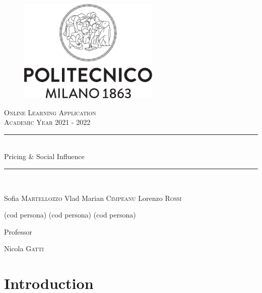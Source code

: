 \documentclass{article}
\begin{document}
\begin{titlepage}
      \centering
      \begin{figure}
            \begin{center}
                  \includegraphics[width=0.6\textwidth]{img/logo_polimi.png}
            \end{center}
      \end{figure}
      \vfill
      {\scshape\LARGE Online Learning Application\\Academic Year 2021 - 2022 \par}
      
      
      \vfill
      \newcommand{\HRule}{\rule{\linewidth}{0.3mm}}
      \centering
      \HRule \\[0.4cm]
      \huge  Pricing \& Social Influence\\%
      \HRule \\
      \vspace{1cm}
      {\Large Sofia \textsc{Martellozzo} \quad  Vlad Marian \textsc{Cimpeanu}  \quad  Lorenzo \textsc{Rossi}\par}
      {\Large(cod persona) \quad (cod persona) \quad (cod persona) \par}
      \vfill
      {\large Professor\par
          Nicola \textsc{Gatti}}
\end{titlepage}


\newpage
\renewcommand\contentsname{Contents}
\tableofcontents

\newpage

\section*{Introduction}



\newpage
\end{document}
